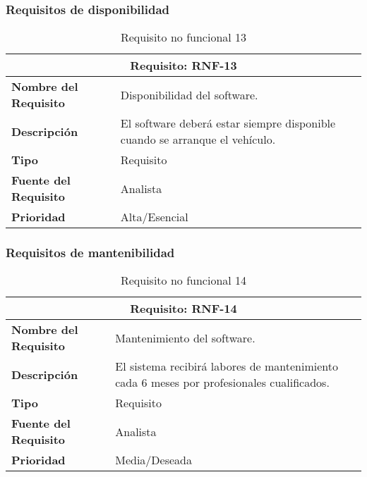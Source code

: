 \subsubsection{Requisitos de disponibilidad}

\begin{table}[H]
\begin{center}
\begin{tabular}{p{} p{7cm}}
\multicolumn{2}{c}{\textbf{Requisito: RNF-13} } \\
\hline \hline
\textbf{Nombre del Requisito} & Disponibilidad del software.\\
\hline
\textbf{Descripción} & El software deberá estar siempre disponible cuando se arranque el vehículo.\\
\hline
\textbf{Tipo} & Requisito  \\
\hline
\textbf{Fuente del Requisito} & Analista  \\
\hline
\textbf{Prioridad} & Alta/Esencial \\ \hline
\end{tabular}
\caption{Requisito no funcional 13}
\label{tab:RNF-13}
\end{center}
\end{table}


\subsubsection{Requisitos de mantenibilidad}

\begin{table}[H]
\begin{center}
\begin{tabular}{p{} p{7cm}}
\multicolumn{2}{c}{\textbf{Requisito: RNF-14} } \\
\hline \hline
\textbf{Nombre del Requisito} & Mantenimiento del software.\\
\hline
\textbf{Descripción} & El sistema recibirá labores de mantenimiento cada 6 meses por profesionales cualificados.\\
\hline
\textbf{Tipo} & Requisito  \\
\hline
\textbf{Fuente del Requisito} & Analista  \\
\hline
\textbf{Prioridad} & Media/Deseada \\ \hline
\end{tabular}
\caption{Requisito no funcional 14}
\label{tab:RNF-14}
\end{center}
\end{table}


